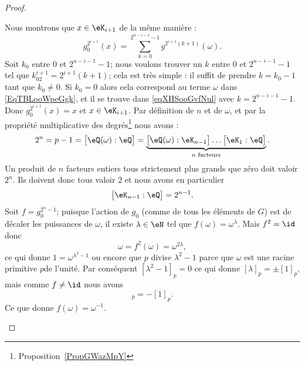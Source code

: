 \begin{proof}
\begin{subproof}
\begin{subproof}
			Nous montrons que \( x\in \eK_{i+1}\) de la même manière :
			\begin{equation}    \label{eqXHSooGvfNul}
				g_0^{2^{i+1}}(x)=\sum_{k=0}^{2^{n-i-1}-1}g^{2^{i+1}(k+1)}(\omega).
			\end{equation}
			Soit \( k_0\) entre \( 0\) et \( 2^{n-i-1}-1\); nous voulons trouver un \( k\) entre \( 0\) et \( 2^{n-i-1}-1\) tel que \( k_02^{i+1}=2^{i+1}(k+1)\); cela est très simple : il suffit de prendre \( k=k_0-1\) tant que \( k_0\neq 0\). Si \( k_0=0\) alors cela correspond au terme \( \omega\) dans \eqref{EqTBLooWpeGgk}, et il se trouve dans \eqref{eqXHSooGvfNul} avec \( k=2^{n-i-1}-1\). Donc \( g_0^{2^{i+1}}(x)=x\) et \( x\in \eK_{i+1}\).
			Par définition de \( n\) et de \( \omega\), et par la propriété multiplicative des degrés\footnote{Proposition~\ref{PropGWazMpY}} nous avons :
			\begin{equation}
				2^n=p-1=\big[ \eQ(\omega):\eQ \big]=\underbrace{\big[ \eQ(\omega):\eK_{n-1} \big]\ldots\big[ \eK_1:\eQ \big]}_{ n\text{ facteurs}}.
			\end{equation}
			Un produit de \( n\) facteurs entiers tous strictement plus grands que zéro doit valoir \( 2^n\). Ils doivent donc tous valoir \( 2\) et nous avons en particulier
			\begin{equation}
				\big[ \eK_{n-1}:\eQ \big]=2^{n-1}.
			\end{equation}
			\spitem[\( \cos(2\pi/p)\in \eK_{n-1}\)]
			Soit \( f=g_0^{2^n-1}\); puisque l'action de \( g_0\) (comme de tous les éléments de \( G\)) est de décaler les puissances de \( \omega\), il existe \( \lambda\in \eN\) tel que \( f(\omega)=\omega^{\lambda}\). Mais \( f^2=\id\) donc
			\begin{equation}
				\omega=f^2(\omega)=\omega^{2\lambda},
			\end{equation}
			ce qui donne \( 1=\omega^{\lambda^2-1}\) ou encore que \( p\) divise \( \lambda^2-1\) parce que \( \omega\) est une racine primitive \( p\)\ieme de l'unité. Par conséquent \( [\lambda^2-1]_p=0\) ce qui donne \( [\lambda]_p=\pm[1]_p\), mais comme \( f\neq \id\) nous avons
			\begin{equation}
				[\lambda]_p=-[1]_p.
			\end{equation}
			Ce que donne \( f(\omega)=\omega^{-1}\).


\end{subproof}
\end{subproof}
\end{proof}
